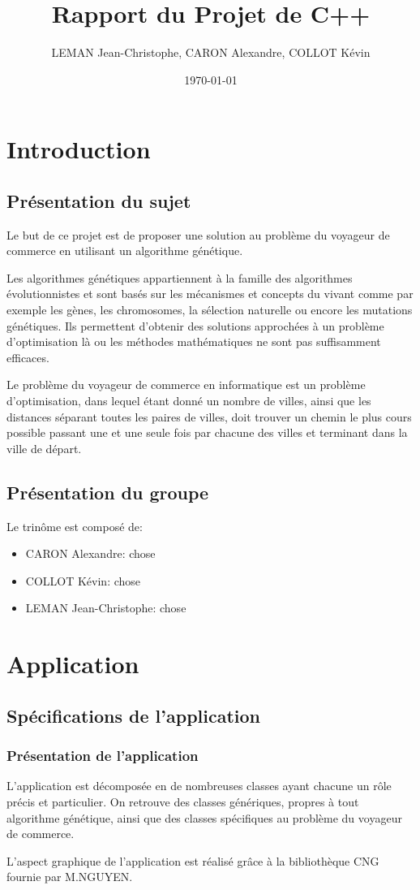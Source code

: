 \documentclass{report}
\title{Rapport du Projet de C++}
\author{LEMAN Jean-Christophe, CARON Alexandre, COLLOT Kévin}
\date{\today}
\begin{document}
\maketitle
\tableofcontents


\chapter{Introduction}
\section{Présentation du sujet}
Le but de ce projet est de proposer une solution au problème du voyageur de commerce en utilisant un algorithme génétique.
\par Les algorithmes génétiques appartiennent à la famille des algorithmes évolutionnistes et sont basés sur les mécanismes et concepts du vivant comme par exemple les gènes, les chromosomes, la sélection naturelle ou encore les mutations génétiques. Ils permettent d'obtenir des solutions approchées à un problème d'optimisation là ou les méthodes mathématiques ne sont pas suffisamment efficaces.\par 
Le problème du voyageur de commerce en informatique est un problème d'optimisation, dans lequel étant donné un nombre de villes, ainsi que les distances séparant toutes les paires de villes, doit trouver un chemin le plus cours possible passant une et une seule fois par chacune des villes et terminant dans la ville de départ.
\section{Présentation du groupe}
Le trinôme est composé de:
\begin{itemize}
\item CARON Alexandre: chose
\item COLLOT Kévin: chose
\item LEMAN Jean-Christophe: chose
\end{itemize}

\chapter{Application}
\section{Spécifications de l'application}
\subsection{Présentation de l'application}
L'application est décomposée en de nombreuses classes ayant chacune un rôle précis et particulier. On retrouve des classes génériques, propres à tout algorithme génétique, ainsi que des classes spécifiques au problème du voyageur de commerce.\par 
L'aspect graphique de l'application est réalisé grâce à la bibliothèque CNG fournie par M.NGUYEN.
\end{document}
